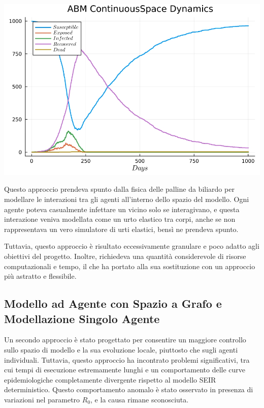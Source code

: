 \begin{minipage}{\linewidth}
    \centering
    \includegraphics[width=\textwidth]{img/plot_abm_continuousspace.jpg}
    \label{fig:seir_curve_continuous}
\end{minipage}

Questo approccio prendeva spunto dalla fisica delle palline da 
biliardo per modellare le interazioni tra gli agenti all'interno 
dello spazio del modello. Ogni agente poteva casualmente infettare 
un vicino solo se interagivano, e questa interazione veniva modellata 
come un urto elastico tra corpi, anche se non rappresentava un vero 
simulatore di urti elastici, bensì ne prendeva spunto.

Tuttavia, questo approccio è risultato eccessivamente granulare e 
poco adatto agli obiettivi del progetto. Inoltre, richiedeva una 
quantità considerevole di risorse computazionali e tempo, il che 
ha portato alla sua sostituzione con un approccio più astratto e flessibile.
\newpage

\subsection{Modello ad Agente con Spazio a Grafo e Modellazione Singolo Agente}

Un secondo approccio è stato progettato per consentire un maggiore 
controllo sullo spazio di modello e la sua evoluzione locale, 
piuttosto che sugli agenti individuali. Tuttavia, questo approccio 
ha incontrato problemi significativi, tra cui tempi di esecuzione 
estremamente lunghi e un comportamento delle curve epidemiologiche 
completamente divergente rispetto al modello SEIR deterministico. 
Questo comportamento anomalo è stato osservato in presenza di variazioni 
nel parametro $R_0$, e la causa rimane sconosciuta.

